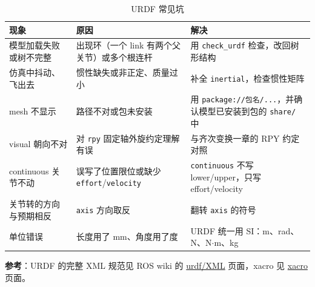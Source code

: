 \begin{table}[H]
	\centering
	\caption{URDF 常见坑}
	\label{tab:URDF:常见坑}
	\begin{tabular}{>{\raggedright\arraybackslash}p{3.1cm}>{\raggedright\arraybackslash}p{4.6cm}>{\raggedright\arraybackslash}p{5.6cm}}
		\hline
		现象 & 原因 & 解决 \\
		\hline
		模型加载失败或树不完整 & 出现环（一个 link 有两个父关节）或多个根连杆 & 用 \texttt{check\_urdf} 检查，改回树形结构 \\
		仿真中抖动、飞出去 & 惯性缺失或非正定、质量过小 & 补全 \texttt{inertial}，检查惯性矩阵 \\
		mesh 不显示 & 路径不对或包未安装 & 用 \texttt{package://包名/...}，并确认模型已安装到包的 \texttt{share/} 中 \\
		visual 朝向不对 & 对 \texttt{rpy} 固定轴外旋约定理解有误 & 与齐次变换一章的 RPY 约定对照 \\
		continuous 关节不动 & 误写了位置限位或缺少 \texttt{effort}/\texttt{velocity} & \texttt{continuous} 不写 lower/upper，只写 effort/velocity \\
		关节转的方向与预期相反 & \texttt{axis} 方向取反 & 翻转 \texttt{axis} 的符号 \\
		单位错误 & 长度用了 mm、角度用了度 & URDF 统一用 SI：m、rad、N、N$\cdot$m、kg \\
		\hline
	\end{tabular}
\end{table}

\textbf{参考}：URDF 的完整 XML 规范见 ROS wiki 的 \href{https://wiki.ros.org/urdf/XML}{urdf/XML} 页面，xacro 见 \href{https://wiki.ros.org/xacro}{xacro} 页面。
